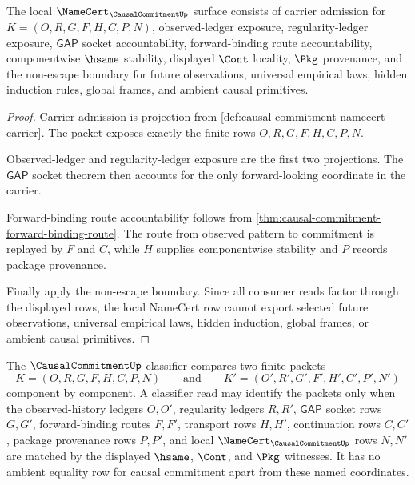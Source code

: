 \begin{theorem}
\label{thm:causal-commitment-namecert-obligations}
The local $\NameCert_{\CausalCommitmentUp}$ surface consists of carrier admission for $K=(O,R,G,F,H,C,P,N)$, observed-ledger exposure, regularity-ledger exposure, $\mathsf{GAP}$ socket accountability, forward-binding route accountability, componentwise $\hsame$ stability, displayed $\Cont$ locality, $\Pkg$ provenance, and the non-escape boundary for future observations, universal empirical laws, hidden induction rules, global frames, and ambient causal primitives.
\end{theorem}
\begin{proof}
Carrier admission is projection from \autoref{def:causal-commitment-namecert-carrier}. The packet exposes exactly the finite rows $O,R,G,F,H,C,P,N$.

Observed-ledger and regularity-ledger exposure are the first two projections. The $\mathsf{GAP}$ socket theorem then accounts for the only forward-looking coordinate in the carrier.

Forward-binding route accountability follows from \autoref{thm:causal-commitment-forward-binding-route}. The route from observed pattern to commitment is replayed by $F$ and $C$, while $H$ supplies componentwise stability and $P$ records package provenance.

Finally apply the non-escape boundary. Since all consumer reads factor through the displayed rows, the local NameCert row cannot export selected future observations, universal empirical laws, hidden induction, global frames, or ambient causal primitives.
\end{proof}

\begin{definition}
\label{def:causal-commitment-classifier-row}
The $\CausalCommitmentUp$ classifier compares two finite packets
$$
K=(O,R,G,F,H,C,P,N)
\qquad\text{and}\qquad
K'=(O',R',G',F',H',C',P',N')
$$
component by component. A classifier read may identify the packets only when the observed-history ledgers $O,O'$, regularity ledgers $R,R'$, $\mathsf{GAP}$ socket rows $G,G'$, forward-binding routes $F,F'$, transport rows $H,H'$, continuation rows $C,C'$, package provenance rows $P,P'$, and local $\NameCert_{\CausalCommitmentUp}$ rows $N,N'$ are matched by the displayed $\hsame$, $\Cont$, and $\Pkg$ witnesses. It has no ambient equality row for causal commitment apart from these named coordinates.
\end{definition}

